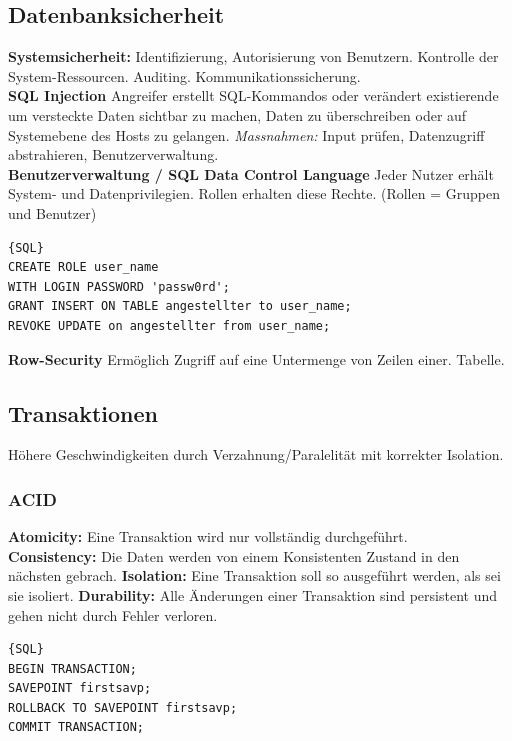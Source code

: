\documentclass[7pt,landscape,a4paper]{scrartcl}
\begin{document}
\begin{multicols*}{4}
\subsection{Datenbanksicherheit}
\textbf{Systemsicherheit:} Identifizierung, Autorisierung von Benutzern. Kontrolle der System-Ressourcen. Auditing. Kommunikationssicherung.\\
\textbf{SQL Injection}
Angreifer erstellt SQL-Kommandos oder verändert existierende um versteckte Daten sichtbar zu machen, Daten zu überschreiben oder auf Systemebene des Hosts zu gelangen. \textit{Massnahmen:} Input prüfen, Datenzugriff abstrahieren, Benutzerverwaltung.\\
\textbf{Benutzerverwaltung / SQL Data Control Language}
Jeder Nutzer erhält System- und Datenprivilegien. Rollen erhalten diese Rechte. (Rollen = Gruppen und Benutzer)
\begin{lstlisting}{SQL}
CREATE ROLE user_name
WITH LOGIN PASSWORD 'passw0rd';
GRANT INSERT ON TABLE angestellter to user_name;
REVOKE UPDATE on angestellter from user_name;
\end{lstlisting}
\textbf{Row-Security} Ermöglich Zugriff auf eine Untermenge von Zeilen einer. Tabelle.
\subsection{Transaktionen}
Höhere Geschwindigkeiten durch Verzahnung/Paralelität mit korrekter Isolation. 
\subsubsection{ACID}
\textbf{Atomicity:} Eine Transaktion wird nur vollständig durchgeführt.\\ \textbf{Consistency:} Die Daten werden von einem Konsistenten Zustand in den nächsten gebrach. \textbf{Isolation:} Eine Transaktion soll so ausgeführt werden, als sei sie isoliert. \textbf{Durability:} Alle Änderungen einer Transaktion sind persistent und gehen nicht durch Fehler verloren.
\begin{lstlisting}{SQL}
BEGIN TRANSACTION;
SAVEPOINT firstsavp;
ROLLBACK TO SAVEPOINT firstsavp;
COMMIT TRANSACTION;
\end{lstlisting}

\end{multicols*}
\end{document}
